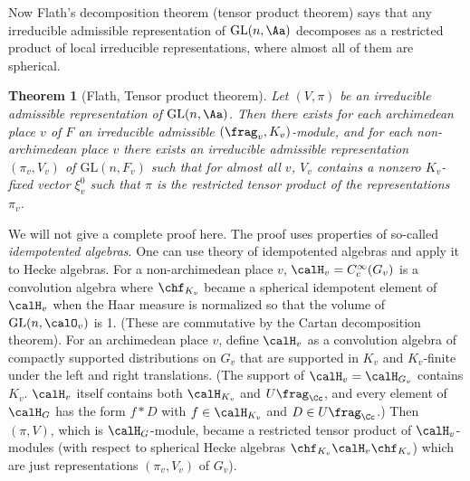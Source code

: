 \documentclass{article}
\newtheorem{theorem}{Theorem}[section]
\newcommand{\GL}{\mathrm{GL}}
\begin{document}
Now Flath's decomposition theorem (tensor product theorem) says that any irreducible admissible representation of $\GL(n, \Aa)$ decomposes as a restricted product of local irreducible representations, where almost all of them are spherical. 

\begin{theorem}[Flath, Tensor product theorem]
Let $(V, \pi)$ be an irreducible admissible representation of $\GL(n, \Aa)$. Then there exists for each archimedean place $v$ of $F$ an irreducible admissible $(\frag_{v}, K_{v})$-module, and for each non-archimedean place $v$ there exists an irreducible admissible representation $(\pi_{v}, V_{v})$ of $\GL(n, F_{v})$ such that for almost all $v$, $V_{v}$ contains a nonzero $K_{v}$-fixed vector $\xi_{v}^{0}$ such that $\pi$ is the restricted tensor product of the representations $\pi_{v}$. 
\end{theorem}
We will not give a complete proof here. The proof uses properties of so-called \emph{idempotented algebras}. One can use theory of idempotented algebras and apply it to Hecke algebras. 
For a non-archimedean place $v$, $\calH_{v} = C_{c}^{\infty}(G_{v})$ is a convolution algebra where $\chf_{K_{v}}$ became a spherical idempotent element of $\calH_{v}$ when the Haar measure is normalized so that the volume of $\GL(n, \calO_{v})$ is 1. (These are commutative by the Cartan decomposition theorem). 
For an archimedean place $v$, define $\calH_{v}$ as a convolution algebra of compactly supported distributions on $G_{v}$ that are supported in $K_{v}$ and $K_{v}$-finite under the left and right translations. 
(The support of $\calH_{v} = \calH_{G_{v}}$ contains $K_{v}$. $\calH_{v}$ itself contains both $\calH_{K_{v}}$ and $U\frag_{\Cc}$, and every element of $\calH_{G}$ has the form $f * D$ with $f\in \calH_{K_{v}}$ and $D\in U\frag_{\Cc}$.)
Then $(\pi, V)$, which is $\calH_{G}$-module, became a restricted tensor product of $\calH_{v}$-modules (with respect to spherical Hecke algebras $\chf_{K_{v}}\calH_{v} \chf_{K_{v}}$) which are just representations $(\pi_{v}, V_{v})$ of $G_{v}$).  
\end{document}
